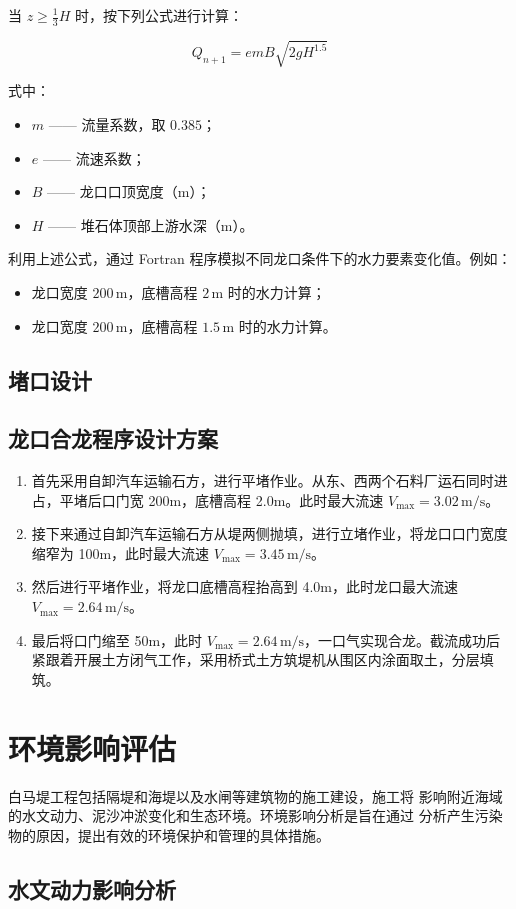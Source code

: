 \documentclass[UTF8, a4paper, 12pt]{ctexart} %
\begin{document}
当 $z \geq \frac{1}{3}H$ 时，按下列公式进行计算：

\[
Q_{n+1} = e m B \sqrt{2g H^{1.5}} \tag{3.36}
\]

式中：
\begin{itemize}
    \item $m$ —— 流量系数，取 $0.385$；
    \item $e$ —— 流速系数；
    \item $B$ —— 龙口口顶宽度（$\text{m}$）；
    \item $H$ —— 堆石体顶部上游水深（$\text{m}$）。
\end{itemize}

利用上述公式，通过 Fortran 程序模拟不同龙口条件下的水力要素变化值。例如：
\begin{itemize}
    \item 龙口宽度 $200\,\text{m}$，底槽高程 $2\,\text{m}$ 时的水力计算；
    \item 龙口宽度 $200\,\text{m}$，底槽高程 $1.5\,\text{m}$ 时的水力计算。
\end{itemize}
\subsection{堵口设计}
\subsection{龙口合龙程序设计方案}

\begin{enumerate}
    \item 首先采用自卸汽车运输石方，进行平堵作业。从东、西两个石料厂运石同时进占，平堵后口门宽 200m，底槽高程 2.0m。此时最大流速 $V_{\text{max}} = 3.02\,\text{m/s}$。
    
    \item 接下来通过自卸汽车运输石方从堤两侧抛填，进行立堵作业，将龙口口门宽度缩窄为 100m，此时最大流速 $V_{\text{max}} = 3.45\,\text{m/s}$。
    
    \item 然后进行平堵作业，将龙口底槽高程抬高到 4.0m，此时龙口最大流速 $V_{\text{max}} = 2.64\,\text{m/s}$。
    
    \item 最后将口门缩至 50m，此时 $V_{\text{max}} = 2.64\,\text{m/s}$，一口气实现合龙。截流成功后紧跟着开展土方闭气工作，采用桥式土方筑堤机从围区内涂面取土，分层填筑。
\end{enumerate}
\section{环境影响评估}
白马堤工程包括隔堤和海堤以及水闸等建筑物的施工建设，施工将
影响附近海域的水文动力、泥沙冲淤变化和生态环境。环境影响分析是旨在通过
分析产生污染物的原因，提出有效的环境保护和管理的具体措施。

\subsection{水文动力影响分析}
\end{document}
